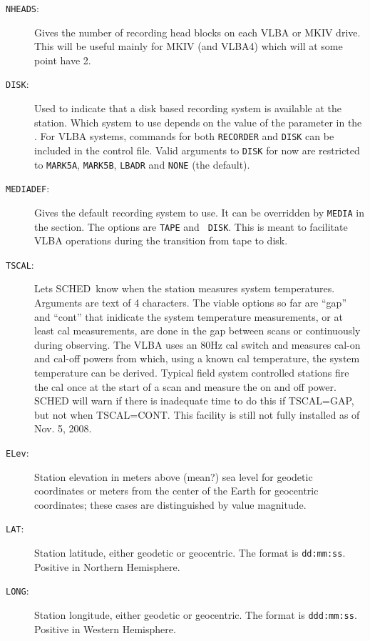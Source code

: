 \documentclass{report}
\newcommand{\schedb}{{\sc SCHED~}}
\begin{document}
\begin{description}
\item[{\tt NHEADS}:] Gives the number of recording head blocks on
each VLBA or MKIV drive.  This will be useful mainly for MKIV
(and VLBA4) which will at some point have 2.

\item [{\tt DISK}:] Used to indicate that a disk based recording system
is available at the station.  Which system to use depends on the value
of the  parameter in the
.  For VLBA
systems, commands for both {\tt RECORDER} and {\tt DISK} can be
included in the control file.  Valid arguments to {\tt DISK} for
now are restricted to {\tt MARK5A}, {\tt MARK5B}, {\tt LBADR}
and {\tt NONE} (the default).

\item [{\tt MEDIADEF}:] Gives the default recording system to use.  It
can be overridden by {\tt MEDIA} in the  section.  The options are {\tt TAPE} and {\tt
DISK}.  This is meant to facilitate VLBA operations during the
transition from tape to disk.

\item [{\tt TSCAL}:] Lets \schedb know when the station measures
system temperatures.  Arguments are text of 4 characters.  The viable
options so far are ``gap'' and ``cont'' that inidicate the system temperature
measurements, or at least cal measurements, are done in the gap between
scans or continuously during observing.  The VLBA uses an 80Hz cal switch
and measures cal-on and cal-off powers from which, using a known cal
temperature, the system temperature can be derived.  Typical field system
controlled stations fire the cal once at the start of a scan and measure
the on and off power.  {\sc SCHED} will warn if there is inadequate time to
do this if TSCAL=GAP, but not when TSCAL=CONT.  This facility is still
not fully installed as of Nov. 5, 2008.

\item [{\tt ELev}:] Station elevation in meters above (mean?) sea
level for geodetic coordinates or meters from the center of the Earth
for geocentric coordinates; these cases are distinguished by value
magnitude.

\item [{\tt LAT}:] Station latitude, either geodetic or geocentric.
The format is {\tt dd:mm:ss}. Positive in Northern Hemisphere.

\item [{\tt LONG}:] Station longitude, either geodetic or geocentric.
The format is {\tt ddd:mm:ss}. Positive in Western Hemisphere.


\end{description}
\end{document}
